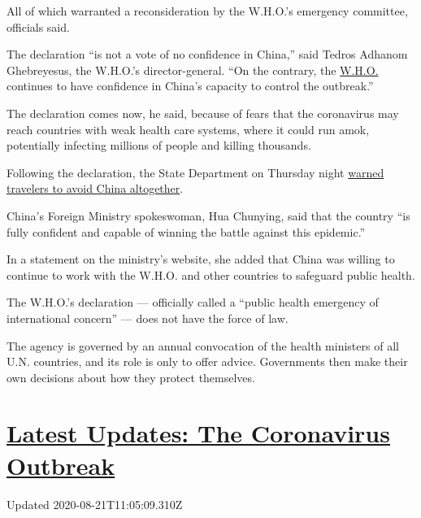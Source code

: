 All of which warranted a reconsideration by the W.H.O.'s emergency
committee, officials said.

The declaration ``is not a vote of no confidence in China,'' said Tedros
Adhanom Ghebreyesus, the W.H.O.'s director-general. ``On the contrary,
the
\href{https://www.nytimes3xbfgragh.onion/2020/04/16/health/WHO-Trump-coronavirus.html}{W.H.O.}
continues to have confidence in China's capacity to control the
outbreak.''

The declaration comes now, he said, because of fears that the
coronavirus may reach countries with weak health care systems, where it
could run amok, potentially infecting millions of people and killing
thousands.

Following the declaration, the State Department on Thursday night
\href{https://travel.state.gov/content/travel/en/traveladvisories/traveladvisories/china-travel-advisory.html}{warned
travelers to avoid China altogether}.

China's Foreign Ministry spokeswoman, Hua Chunying, said that the
country ``is fully confident and capable of winning the battle against
this epidemic.''

In a statement on the ministry's website, she added that China was
willing to continue to work with the W.H.O. and other countries to
safeguard public health.

The W.H.O.'s declaration --- officially called a ``public health
emergency of international concern'' --- does not have the force of law.

The agency is governed by an annual convocation of the health ministers
of all U.N. countries, and its role is only to offer advice. Governments
then make their own decisions about how they protect themselves.

\hypertarget{latest-updates-the-coronavirus-outbreak}{%
\section{\texorpdfstring{\href{https://www.nytimes3xbfgragh.onion/2020/08/21/world/covid-19-coronavirus.html?action=click\&pgtype=Article\&state=default\&region=MAIN_CONTENT_1\&context=storylines_live_updates}{Latest
Updates: The Coronavirus
Outbreak}}{Latest Updates: The Coronavirus Outbreak}}\label{latest-updates-the-coronavirus-outbreak}}

Updated 2020-08-21T11:05:09.310Z

